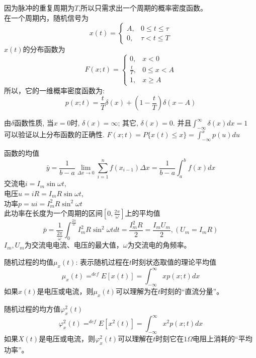 \begin{frame}[shrink]
\begin{example}[解]
	因为脉冲的重复周期为$T$,所以只需求出一个周期的概率密度函数。\\
	在一个周期内，随机信号为
	\[
	x(t)=\begin{cases}
	A,&0\le t\le\tau\\
	0,&\tau<t\le T
	\end{cases} 
	\]
	$x(t)$的分布函数为
	\[
	F(x;t)=\begin{cases}
	0,&x<0\\
	\frac{t}{T},&0\le x<A\\
	1,&x\ge A
	\end{cases} 
	\]
	所以，它的一维概率密度函数为:
	\[p(x;t)=\frac{t}{T}\delta(x)+(1-\frac{t}{T})\delta(x-A) \]
\end{example}
\small
由$\delta$函数性质, 当$x=0$时, $\delta(x)=\infty$; 其它, $\delta(x)=0$. 并且$\int_{-\infty}^{\infty}\delta(x)dx=1$\\
可以验证以上分布函数的正确性.  $F(x; t)=P\{x(t)\le x\}=\int_{-\infty}^{x}p(u)du$
\end{frame}


\begin{frame}
函数的均值
\[\bar{y}=\frac{1}{b-a}\lim\limits_{\Delta x\to 0}\sum\limits_{i=1}^{n}f(x_{i-1})\Delta x=\frac{1}{b-a}\int_{a}^{b}f(x)dx \]
交流电$i=I_m\sin\omega t$,\\
电压$u=iR=I_mR\sin\omega t$,\\
功率$p=ui=I_m^2R\sin^2\omega t$\\
此功率在长度为一个周期的区间$[0,\frac{2\pi}{\omega}]$上的平均值
\[\bar{p}=\frac{1}{\frac{2\pi}{\omega}}\int_{0}^{\frac{2\pi}{\omega}}I_m^2R\sin^2\omega tdt=\frac{I_m^2R}{2}=\frac{I_mU_m}{2},(U_m=I_mR) \]
$I_m,U_m$为交流电电流、电压的最大值，$\omega$为交流电的角频率。
\end{frame}

\begin{frame}
\begin{block}{随机过程的均值$\mu_x(t)$: 表示随机过程在$t$时刻状态取值的理论平均值}
	\[\mu_x(t)\mathop{=}^{def}E[x(t)]=\int_{-\infty}^{\infty}xp(x;t)dx \]
	如果$x(t)$是电压或电流，则$\mu_x(t)$可以理解为在$t$时刻的``直流分量''。
\end{block}

\begin{block}{随机过程的均方值$\varphi_x^2(t)$}
	\[\varphi_x^2(t)\mathop{=}^{def}E[x^2(t)]=\int_{-\infty}^{\infty}x^2p(x;t)dx \]
	如果$X(t)$是电压或电流，则$\varphi_x^2(t)$可以理解在$t$时刻它在$1\Omega$电阻上消耗的``平均功率''。
\end{block}
\end{frame}

